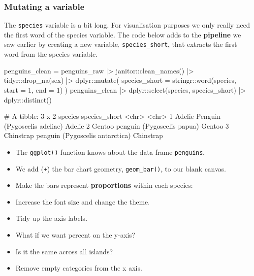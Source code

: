 \documentclass[a4paper]{article}
\begin{document}
\subsubsection{Mutating a variable}
The \lstinline|species| variable is a bit long. For visualisation purposes we only really need the first word of the species variable. The code below adds to the \textbf{pipeline} we saw earlier by creating a new variable, \lstinline|species_short|, that extracts the first word from the species variable.
\begin{Schunk}
\begin{Sinput}
penguins_clean = penguins_raw |>
  janitor::clean_names() |>
  tidyr::drop_na(sex) |>
  dplyr::mutate(
  species_short = stringr::word(species, start = 1, end = 1)
  )
penguins_clean |>
  dplyr::select(species, species_short) |>
  dplyr::distinct()
\end{Sinput}
\begin{Soutput}
# A tibble: 3 x 2
  species                                   species_short
  <chr>                                     <chr>        
1 Adelie Penguin (Pygoscelis adeliae)       Adelie       
2 Gentoo penguin (Pygoscelis papua)         Gentoo       
3 Chinstrap penguin (Pygoscelis antarctica) Chinstrap    
\end{Soutput}
\end{Schunk}
\begin{itemize}
	\item The \lstinline|ggplot()| function knows about the data frame \lstinline|penguins|.
	\item We add (\lstinline|+|) the bar chart geometry, \lstinline|geom_bar()|, to our blank canvas.
	\item Make the bars represent \textbf{proportions} within each species:
	\item Increase the font size and change the theme.
	\item Tidy up the axis labels.
	\item What if we want percent on the y-axis?
	\item Is it the same across all islands?
	\item Remove empty categories from the x axis.
\end{itemize}
\end{document}
